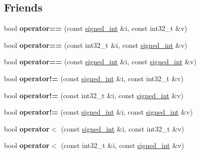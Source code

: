 \subsection*{Friends}
\begin{DoxyCompactItemize}
\item 
\mbox{\label{structsigned__int_a7e5690c7ad2505e2297e0e536a3ad740}} 
bool {\bfseries operator==} (const \mbox{\hyperlink{structsigned__int}{signed\+\_\+int}} \&i, const int32\+\_\+t \&v)
\item 
\mbox{\label{structsigned__int_aec106017391627bd0e273592c18a0eb5}} 
bool {\bfseries operator==} (const int32\+\_\+t \&i, const \mbox{\hyperlink{structsigned__int}{signed\+\_\+int}} \&v)
\item 
\mbox{\label{structsigned__int_a5612a3dbcbfd3d1fa335aa402c29ac35}} 
bool {\bfseries operator==} (const \mbox{\hyperlink{structsigned__int}{signed\+\_\+int}} \&i, const \mbox{\hyperlink{structsigned__int}{signed\+\_\+int}} \&v)
\item 
\mbox{\label{structsigned__int_a3ee2f31815a95ec9ffd2ab7a7f02d524}} 
bool {\bfseries operator!=} (const \mbox{\hyperlink{structsigned__int}{signed\+\_\+int}} \&i, const int32\+\_\+t \&v)
\item 
\mbox{\label{structsigned__int_a6abfcdc55171168e5679ccd9f37ba471}} 
bool {\bfseries operator!=} (const int32\+\_\+t \&i, const \mbox{\hyperlink{structsigned__int}{signed\+\_\+int}} \&v)
\item 
\mbox{\label{structsigned__int_a6e25feb014836d0288a262e5d488533c}} 
bool {\bfseries operator!=} (const \mbox{\hyperlink{structsigned__int}{signed\+\_\+int}} \&i, const \mbox{\hyperlink{structsigned__int}{signed\+\_\+int}} \&v)
\item 
\mbox{\label{structsigned__int_adbae5ebcac1cb6ed6a7547a427c7cf95}} 
bool {\bfseries operator$<$} (const \mbox{\hyperlink{structsigned__int}{signed\+\_\+int}} \&i, const int32\+\_\+t \&v)
\item 
\mbox{\label{structsigned__int_ae0ebf886eb4f8bd58f41626bfc2d88b7}} 
bool {\bfseries operator$<$} (const int32\+\_\+t \&i, const \mbox{\hyperlink{structsigned__int}{signed\+\_\+int}} \&v)

\end{DoxyCompactItemize}
